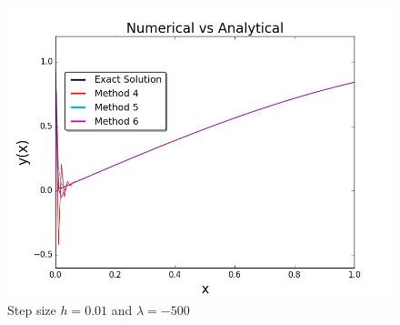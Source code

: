 \documentclass[12pt]{article}
\theoremstyle{remark}
\begin{document}
\begin{figure}[H]
	\centering
	\includegraphics[width=15cm]{reg_-500_01(2).png}
	\caption{Step size $h = 0.01$ and $\lambda = -500$}
\end{figure}
\end{document}
